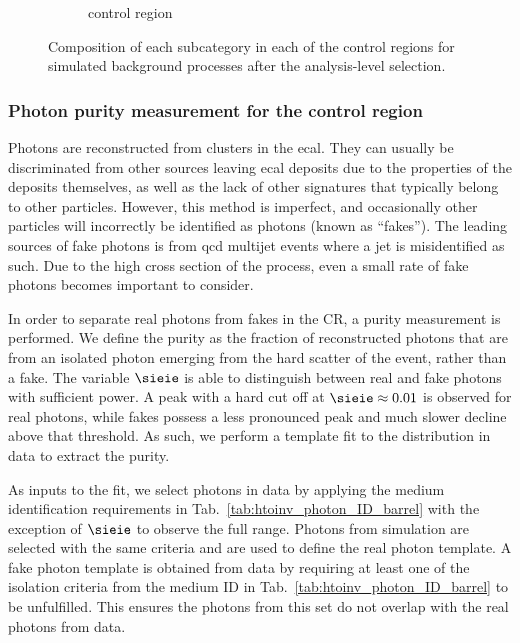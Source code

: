 \begin{figure}[htbp]
\begin{subfigure}[b]{0.3\textwidth}
        \caption{\singlePhotonCr control region}
    \end{subfigure}
    \caption[Composition of each subcategory in each of the control regions for simulated background processes after the analysis-level selection]{Composition of each subcategory in each of the control regions for simulated background processes after the analysis-level selection.}
    \label{fig:htoinv_cr_composition_comb2016to18}
\end{figure}





\subsubsection{Photon purity measurement for the \texorpdfstring{\singlePhotonCr}{photon} control region}
\label{subsubsec:htoinv_photon_purity}

Photons are reconstructed from clusters in the \acrshort{ecal}. They can usually be discriminated from other sources leaving \acrshort{ecal} deposits due to the properties of the deposits themselves, as well as the lack of other signatures that typically belong to other particles. However, this method is imperfect, and occasionally other particles will incorrectly be identified as photons (known as ``fakes''). The leading sources of fake photons is from \acrshort{qcd} multijet events where a \gls{jet} is misidentified as such. Due to the high cross section of the process, even a small rate of fake photons becomes important to consider.

In order to separate real photons from fakes in the \singlePhotonCr \gls{CR}, a purity measurement is performed. We define the purity as the fraction of reconstructed photons that are from an isolated photon emerging from the hard scatter of the event, rather than a fake. The variable $\sieie$ is able to distinguish between real and fake photons with sufficient power. A peak with a hard cut off at $\sieie \approx \text{0.01}$ is observed for real photons, while fakes possess a less pronounced peak and much slower decline above that threshold. As such, we perform a template fit to the distribution in data to extract the purity.

As inputs to the fit, we select photons in data by applying the medium identification requirements in Tab.~\ref{tab:htoinv_photon_ID_barrel} with the exception of $\sieie$ to observe the full range. Photons from \singlePhotonCr simulation are selected with the same criteria and are used to define the real photon template. A fake photon template is obtained from data by requiring at least one of the isolation criteria from the medium ID in Tab.~\ref{tab:htoinv_photon_ID_barrel} to be unfulfilled. This ensures the photons from this set do not overlap with the real photons from data.

